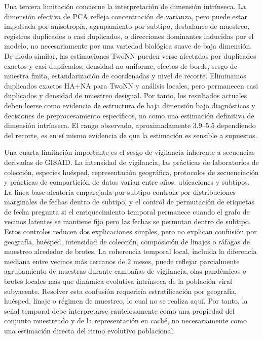 \documentclass[11pt]{article}
\begin{document}
Una tercera limitación concierne la interpretación de dimensión intrínseca. La dimensión efectiva de PCA refleja concentración de varianza, pero puede estar impulsada por anisotropía, agrupamiento por subtipo, desbalance de muestreo, registros duplicados o casi duplicados, o direcciones dominantes inducidas por el modelo, no necesariamente por una variedad biológica suave de baja dimensión. De modo similar, las estimaciones TwoNN pueden verse afectadas por duplicados exactos y casi duplicados, densidad no uniforme, efectos de borde, sesgo de muestra finita, estandarización de coordenadas y nivel de recorte. Eliminamos duplicados exactos HA+NA para TwoNN y análisis locales, pero permanecen casi duplicados y densidad de muestreo desigual. Por tanto, los resultados actuales deben leerse como evidencia de estructura de baja dimensión bajo diagnósticos y decisiones de preprocesamiento específicos, no como una estimación definitiva de dimensión intrínseca. El rango observado, aproximadamente 3.9--5.5 dependiendo del recorte, es en sí mismo evidencia de que la estimación es sensible a supuestos.

Una cuarta limitación importante es el sesgo de vigilancia inherente a secuencias derivadas de GISAID. La intensidad de vigilancia, las prácticas de laboratorios de colección, especies huésped, representación geográfica, protocolos de secuenciación y prácticas de compartición de datos varían entre años, ubicaciones y subtipos. La línea base aleatoria emparejada por subtipo controla por distribuciones marginales de fechas dentro de subtipo, y el control de permutación de etiquetas de fecha pregunta si el enriquecimiento temporal permanece cuando el grafo de vecinos latentes se mantiene fijo pero las fechas se permutan dentro de subtipo. Estos controles reducen dos explicaciones simples, pero no explican confusión por geografía, huésped, intensidad de colección, composición de linajes o ráfagas de muestreo alrededor de brotes. La coherencia temporal local, incluida la diferencia mediana entre vecinos más cercanos de 2 meses, puede reflejar parcialmente agrupamiento de muestras durante campañas de vigilancia, olas pandémicas o brotes locales más que dinámica evolutiva intrínseca de la población viral subyacente. Resolver esta confusión requeriría estratificación por geografía, huésped, linaje o régimen de muestreo, lo cual no se realiza aquí. Por tanto, la señal temporal debe interpretarse cautelosamente como una propiedad del conjunto muestreado y de la representación en caché, no necesariamente como una estimación directa del ritmo evolutivo poblacional.
\end{document}
